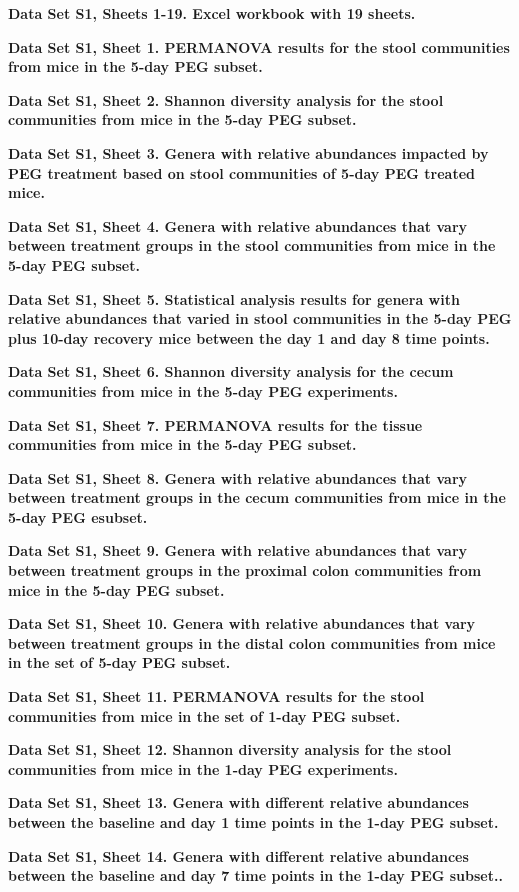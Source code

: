 \documentclass[
  11pt,
]{article}
\begin{document}
\textbf{Data Set S1, Sheets 1-19. Excel workbook with 19 sheets.}

\textbf{Data Set S1, Sheet 1. PERMANOVA results for the stool
communities from mice in the 5-day PEG subset.}

\textbf{Data Set S1, Sheet 2. Shannon diversity analysis for the stool
communities from mice in the 5-day PEG subset.}

\textbf{Data Set S1, Sheet 3. Genera with relative abundances impacted
by PEG treatment based on stool communities of 5-day PEG treated mice.}

\textbf{Data Set S1, Sheet 4. Genera with relative abundances that vary
between treatment groups in the stool communities from mice in the 5-day
PEG subset.}

\textbf{Data Set S1, Sheet 5. Statistical analysis results for genera
with relative abundances that varied in stool communities in the 5-day
PEG plus 10-day recovery mice between the day 1 and day 8 time points.}

\textbf{Data Set S1, Sheet 6. Shannon diversity analysis for the cecum
communities from mice in the 5-day PEG experiments.}

\textbf{Data Set S1, Sheet 7. PERMANOVA results for the tissue
communities from mice in the 5-day PEG subset.}

\textbf{Data Set S1, Sheet 8. Genera with relative abundances that vary
between treatment groups in the cecum communities from mice in the 5-day
PEG esubset.}

\textbf{Data Set S1, Sheet 9. Genera with relative abundances that vary
between treatment groups in the proximal colon communities from mice in
the 5-day PEG subset.}

\textbf{Data Set S1, Sheet 10. Genera with relative abundances that vary
between treatment groups in the distal colon communities from mice in
the set of 5-day PEG subset.}

\textbf{Data Set S1, Sheet 11. PERMANOVA results for the stool
communities from mice in the set of 1-day PEG subset.}

\textbf{Data Set S1, Sheet 12. Shannon diversity analysis for the stool
communities from mice in the 1-day PEG experiments.}

\textbf{Data Set S1, Sheet 13. Genera with different relative abundances
between the baseline and day 1 time points in the 1-day PEG subset.}

\textbf{Data Set S1, Sheet 14. Genera with different relative abundances
between the baseline and day 7 time points in the 1-day PEG subset..}
\end{document}
